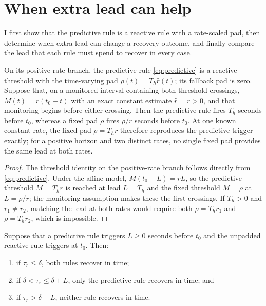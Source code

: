 \section{When extra lead can help}
\label{sec:analysis}

I first show that the predictive rule is a reactive rule with a rate-scaled
pad, then determine when extra lead can change a recovery outcome, and finally
compare the lead that each rule must spend to recover in every case.

\begin{proposition}
\label{prop:reduction}
On its positive-rate branch, the predictive rule \eqref{eq:predictive} is a
reactive threshold with the time-varying pad $\rho(t)=T_h\hat r(t)$; its
fallback pad is zero.  Suppose that, on a monitored interval containing both
threshold crossings, $M(t)=r(t_0-t)$ with an exact constant estimate $\hat
r=r>0$, and that monitoring begins before either crossing.  Then the predictive
rule fires $T_h$ seconds before $t_0$, whereas a fixed pad $\rho$ fires $\rho/r$
seconds before $t_0$.  At one known constant rate, the fixed pad $\rho=T_h r$
therefore reproduces the predictive trigger exactly; for a positive horizon and
two distinct rates, no single fixed pad provides the same lead at both rates.
\end{proposition}

\begin{proof}
The threshold identity on the positive-rate branch follows directly from
\eqref{eq:predictive}.  Under the affine model, $M(t_0-L)=rL$, so the predictive
threshold $M=T_h r$ is reached at lead $L=T_h$ and the fixed threshold $M=\rho$
at $L=\rho/r$; the monitoring assumption makes these the first crossings.  If
$T_h>0$ and $r_1\neq r_2$, matching the lead at both rates would require both
$\rho=T_h r_1$ and $\rho=T_h r_2$, which is impossible.
\end{proof}

\begin{proposition}
\label{prop:boundary}
Suppose that a predictive rule triggers $L\ge0$ seconds before $t_0$ and the
unpadded reactive rule triggers at $t_0$.  Then:
\begin{enumerate}
  \item if $\tau_r\le\delta$, both rules recover in time;
  \item if $\delta<\tau_r\le\delta+L$, only the predictive rule recovers in
    time; and
  \item if $\tau_r>\delta+L$, neither rule recovers in time.
\end{enumerate}
\end{proposition}

